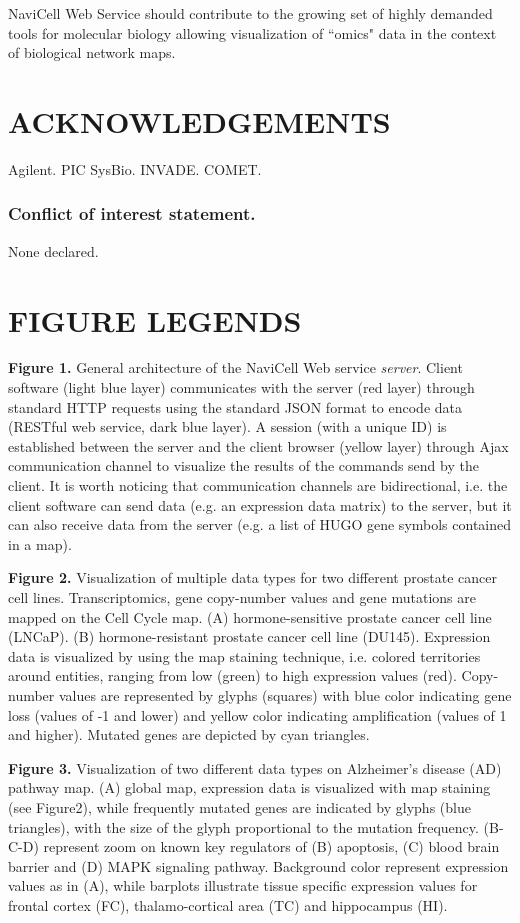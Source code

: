 \documentclass[a4,center,fleqn]{NAR}
\begin{document}
NaviCell Web Service should contribute to the growing set of highly demanded
tools for molecular biology allowing visualization of ``omics" data in the
context of biological network maps.

\section{ACKNOWLEDGEMENTS}

Agilent. PIC SysBio. INVADE. COMET.

\subsubsection{Conflict of interest statement.} None declared.
\newpage



\section{FIGURE LEGENDS}

\textbf{Figure 1.} General architecture of the NaviCell Web service
\emph{server}. Client software (light blue layer) communicates with the server
(red layer) through standard HTTP requests using the standard JSON format to
encode data (RESTful web service, dark blue layer). A session (with a unique ID)
is established between the server and the client browser (yellow layer) through
Ajax communication channel to visualize the results of the commands send by the
client. It is worth noticing that communication channels are bidirectional, i.e.
the client software can send data (e.g. an expression data matrix) to the
server, but it can also receive data from the server (e.g. a list of HUGO
gene symbols contained in a map).

\textbf{Figure 2.} Visualization of multiple data types for two different
prostate cancer cell lines. Transcriptomics, gene copy-number values and gene
mutations \cite{barretina2012cancer} are mapped on the Cell Cycle map. (A)
hormone-sensitive prostate cancer cell line (LNCaP). (B) hormone-resistant
prostate cancer cell line (DU145). Expression data is visualized by using the
map staining technique, i.e. colored territories around entities, ranging from
low  (green) to high expression values (red).  Copy-number values are
represented by glyphs (squares) with blue color indicating gene loss (values of
-1 and lower) and yellow color indicating amplification (values of 1 and
higher). Mutated genes are depicted by cyan triangles.

\textbf{Figure 3.} Visualization of two different data types on Alzheimer's
disease (AD) pathway map.  (A) global map, expression data is visualized with
map staining (see Figure2), while frequently mutated genes are indicated by
glyphs (blue triangles), with the size of the glyph proportional to the
mutation frequency. (B-C-D) represent zoom on known key regulators of (B)
apoptosis, (C) blood brain barrier and (D) MAPK signaling pathway. Background
color represent expression values as in (A), while barplots illustrate tissue
specific expression values for frontal cortex (FC), thalamo-cortical area (TC)
and hippocampus (HI).   
\end{document}
